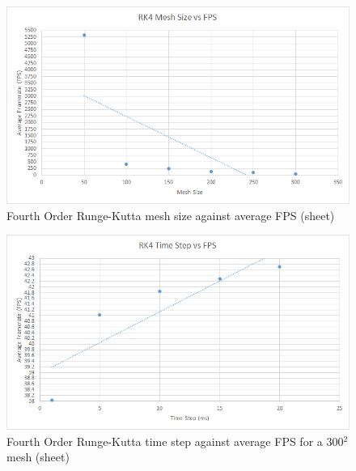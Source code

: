     \begin{figure}
    \begin{center}
      \includegraphics[scale=.9]{Figures/sheet_rk4_m_fps}
    \end{center}
    \caption{Fourth Order Runge-Kutta mesh size against average FPS (sheet)}
    \label{fig:rk4 mesh fps sheet}
  \end{figure}
  
    \begin{figure}
    \begin{center}
      \includegraphics[scale=.9]{Figures/sheet_rk4_ts_fps}
    \end{center}
    \caption{Fourth Order Runge-Kutta time step against average FPS for a 300$^{2}$ mesh (sheet)}
    \label{fig:rk4 step fps sheet}
  \end{figure}
  
